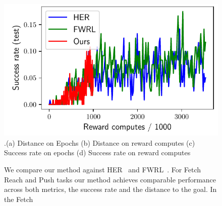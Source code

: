 \begin{figure}
  \includegraphics[width=\frac\columnwidth]{media/res/6efc1de-path_reward_low_thresh_chosen-FetchSlidePR-v1-dqst/reward_computes-test/success_rate.pdf}\\
  {.\tiny\color{blue}\hspace{0.8cm}(a) Distance on Epochs \hspace{1.05cm}(b) Distance on
    reward computes
    \hspace{0.70cm} (c) Success rate on epochs \hspace{0.9cm} (d) Success rate on reward computes}
  \caption{We compare our method against HER~\citep{andrychowicz2016learning}
    and FWRL~\citep{dhiman2018floydwarshall}.
For Fetch Reach and Push tasks our method achieves comparable performance
across both metrics, the success rate and the distance to the goal. In the Fetch
  }%
  \label{fig:path-reward-fetch}%
\end{figure}
